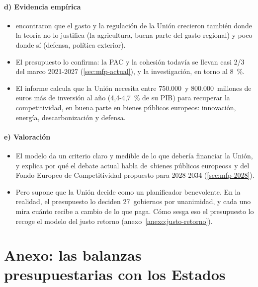 \documentclass[11pt]{article}
\begin{document}
\paragraph{d) Evidencia empírica}

\begin{itemize}
\item \textcite{AlesinaAngeloniSchuknecht2005} encontraron que el gasto y la regulación de la Unión crecieron también donde la teoría no lo justifica (la agricultura, buena parte del gasto regional) y poco donde sí (defensa, política exterior).
\item El presupuesto lo confirma: la PAC y la cohesión todavía se llevan casi 2/3 del marco 2021-2027 (\ref{sec:mfp-actual}), y la investigación, en torno al 8~\%.
\item El informe \textcite{Draghi2024Future} calcula que la Unión necesita entre 750.000~y 800.000~millones de euros más de inversión al año (4,4-4,7~\% de su PIB) para recuperar la competitividad, en buena parte en bienes públicos europeos: innovación, energía, descarbonización y defensa.
\end{itemize}

\paragraph{e) Valoración}

\begin{itemize}
\item El modelo da un criterio claro y medible de lo que debería financiar la Unión, y explica por qué el debate actual habla de «bienes públicos europeos» y del Fondo Europeo de Competitividad propuesto para 2028-2034 (\ref{sec:mfp-2028}).
\item Pero supone que la Unión decide como un planificador benevolente. En la realidad, el presupuesto lo deciden 27~gobiernos por unanimidad, y cada uno mira cuánto recibe a cambio de lo que paga. Cómo sesga eso el presupuesto lo recoge el modelo del justo retorno (anexo~\ref{anexo:justo-retorno}).
\end{itemize}

\section{Anexo: las balanzas presupuestarias con los Estados}\label{anexo:saldos}
\end{document}
